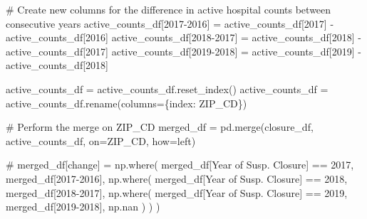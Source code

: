 \documentclass[
  letterpaper,
  DIV=11,
  numbers=noendperiod]{scrartcl}
\newenvironment{Shaded}{\begin{snugshade}}{\end{snugshade}}
\newcommand{\CommentTok}[1]{\textcolor[rgb]{0.37,0.37,0.37}{#1}}
\newcommand{\DecValTok}[1]{\textcolor[rgb]{0.68,0.00,0.00}{#1}}
\newcommand{\NormalTok}[1]{\textcolor[rgb]{0.00,0.23,0.31}{#1}}
\newcommand{\OperatorTok}[1]{\textcolor[rgb]{0.37,0.37,0.37}{#1}}
\newcommand{\StringTok}[1]{\textcolor[rgb]{0.13,0.47,0.30}{#1}}
\begin{document}
\begin{Shaded}
\begin{Highlighting}[]
\CommentTok{\# Create new columns for the difference in active hospital counts between consecutive years}
\NormalTok{active\_counts\_df[}\StringTok{\textquotesingle{}2017{-}2016\textquotesingle{}}\NormalTok{] }\OperatorTok{=}\NormalTok{ active\_counts\_df[}\StringTok{\textquotesingle{}2017\textquotesingle{}}\NormalTok{] }\OperatorTok{{-}}\NormalTok{ active\_counts\_df[}\StringTok{\textquotesingle{}2016\textquotesingle{}}\NormalTok{]}
\NormalTok{active\_counts\_df[}\StringTok{\textquotesingle{}2018{-}2017\textquotesingle{}}\NormalTok{] }\OperatorTok{=}\NormalTok{ active\_counts\_df[}\StringTok{\textquotesingle{}2018\textquotesingle{}}\NormalTok{] }\OperatorTok{{-}}\NormalTok{ active\_counts\_df[}\StringTok{\textquotesingle{}2017\textquotesingle{}}\NormalTok{]}
\NormalTok{active\_counts\_df[}\StringTok{\textquotesingle{}2019{-}2018\textquotesingle{}}\NormalTok{] }\OperatorTok{=}\NormalTok{ active\_counts\_df[}\StringTok{\textquotesingle{}2019\textquotesingle{}}\NormalTok{] }\OperatorTok{{-}}\NormalTok{ active\_counts\_df[}\StringTok{\textquotesingle{}2018\textquotesingle{}}\NormalTok{]}

\NormalTok{active\_counts\_df }\OperatorTok{=}\NormalTok{ active\_counts\_df.reset\_index()}
\NormalTok{active\_counts\_df }\OperatorTok{=}\NormalTok{ active\_counts\_df.rename(columns}\OperatorTok{=}\NormalTok{\{}\StringTok{\textquotesingle{}index\textquotesingle{}}\NormalTok{: }\StringTok{\textquotesingle{}ZIP\_CD\textquotesingle{}}\NormalTok{\})}

\CommentTok{\# Perform the merge on \textquotesingle{}ZIP\_CD\textquotesingle{}}
\NormalTok{merged\_df }\OperatorTok{=}\NormalTok{ pd.merge(closure\_df, active\_counts\_df, on}\OperatorTok{=}\StringTok{\textquotesingle{}ZIP\_CD\textquotesingle{}}\NormalTok{, how}\OperatorTok{=}\StringTok{\textquotesingle{}left\textquotesingle{}}\NormalTok{)}

\CommentTok{\#}
\NormalTok{merged\_df[}\StringTok{\textquotesingle{}change\textquotesingle{}}\NormalTok{] }\OperatorTok{=}\NormalTok{ np.where(}
\NormalTok{    merged\_df[}\StringTok{\textquotesingle{}Year of Susp. Closure\textquotesingle{}}\NormalTok{] }\OperatorTok{==} \DecValTok{2017}\NormalTok{, merged\_df[}\StringTok{\textquotesingle{}2017{-}2016\textquotesingle{}}\NormalTok{],}
\NormalTok{    np.where(}
\NormalTok{        merged\_df[}\StringTok{\textquotesingle{}Year of Susp. Closure\textquotesingle{}}\NormalTok{] }\OperatorTok{==} \DecValTok{2018}\NormalTok{, merged\_df[}\StringTok{\textquotesingle{}2018{-}2017\textquotesingle{}}\NormalTok{],}
\NormalTok{        np.where(}
\NormalTok{            merged\_df[}\StringTok{\textquotesingle{}Year of Susp. Closure\textquotesingle{}}\NormalTok{] }\OperatorTok{==} \DecValTok{2019}\NormalTok{, merged\_df[}\StringTok{\textquotesingle{}2019{-}2018\textquotesingle{}}\NormalTok{],}
\NormalTok{            np.nan  }
\NormalTok{        )}
\NormalTok{    )}
\NormalTok{)}
\end{Highlighting}
\end{Shaded}
\end{document}
